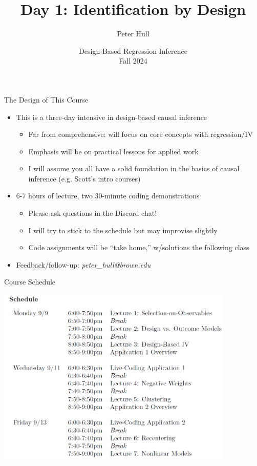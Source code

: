 \documentclass[11pt,english]{beamer}
\begin{document}
\begin{frame}[noframenumbering]{}
\vspace{0.5cm}
\title[]{Day 1: Identification by Design}
\author{Peter Hull}
\date{Design-Based Regression Inference \\Fall 2024} 
\titlepage {\small{}\ }\thispagestyle{empty} \vspace{-30pt}

\end{frame}
 

\begin{frame}{The Design of This Course}
\begin{itemize}
\item This is a three-day intensive in design-based causal inference
\smallskip
\begin{itemize}
\item Far from comprehensive: will focus on core concepts with regression/IV\smallskip
\item Emphasis will be on practical lessons for applied work\smallskip
\item I will assume you all have a solid foundation in the basics of causal inference (e.g. Scott's intro courses)
\end{itemize}\bigskip\pause{}
\item 6-7 hours of lecture, two 30-minute coding demonstrations\smallskip
\begin{itemize}
\item Please ask questions in the Discord chat! \smallskip
\item I will try to stick to the schedule but may improvise slightly\smallskip
\item Code assignments will be ``take home,'' w/solutions the following class
\end{itemize}\bigskip\pause{}
\item Feedback/follow-up: \emph{peter\_hull@brown.edu}
\end{itemize}
\end{frame}

\begin{frame}{Course Schedule}

\begin{center}
\includegraphics[width=0.85\textwidth]{figures/schedule.png}
\end{center}

\end{frame}
\end{document}
